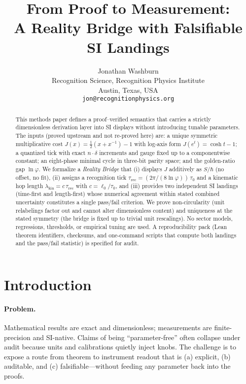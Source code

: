 \documentclass[11pt]{article}
\title{From Proof to Measurement:\\
A Reality Bridge with Falsifiable SI Landings}
\author{Jonathan Washburn\\
Recognition Science, Recognition Physics Institute\\
Austin, Texas, USA\\
\texttt{jon@recognitionphysics.org}}
\date{} %
\theoremstyle{plain}
\theoremstyle{definition}
\theoremstyle{remark}
\begin{document}
\maketitle

\begin{abstract}
This methods paper defines a proof–verified semantics that carries a strictly dimensionless derivation layer into SI displays without introducing tunable parameters. The inputs (proved upstream and not re-proved here) are: a unique symmetric multiplicative cost \(J(x)=\tfrac12(x+x^{-1})-1\) with log-axis form \(J(e^{t})=\cosh t-1\); a quantized tick with exact \(n\cdot\delta\) increments and gauge fixed up to a componentwise constant; an eight-phase minimal cycle in three-bit parity space; and the golden-ratio gap \(\ln\varphi\). We formalize a \emph{Reality Bridge} that (i) displays \(J\) additively as \(S/\hbar\) (no offset, no fit), (ii) assigns a recognition tick \(\tau_{\mathrm{rec}}=(2\pi/(8\ln\varphi))\,\tau_{0}\) and a kinematic hop length \(\lambda_{\mathrm{kin}}=c\,\tau_{\mathrm{rec}}\) with \(c=\ell_{0}/\tau_{0}\), and (iii) provides two independent SI landings (time-first and length-first) whose numerical agreement within stated combined uncertainty constitutes a single pass/fail criterion. We prove non-circularity (unit relabelings factor out and cannot alter dimensionless content) and uniqueness at the stated symmetry (the bridge is fixed up to trivial unit rescalings). No sector models, regressions, thresholds, or empirical tuning are used. A reproducibility pack (Lean theorem identifiers, checksums, and one-command scripts that compute both landings and the pass/fail statistic) is specified for audit.
\end{abstract}

\section{Introduction}
\paragraph{Problem.}
Mathematical results are exact and dimensionless; measurements are finite-precision and SI-native. Claims of being “parameter-free” often collapse under audit because units and calibrations quietly inject knobs. The challenge is to expose a route from theorem to instrument readout that is (a) explicit, (b) auditable, and (c) falsifiable—without feeding any parameter back into the proofs.
\end{document}
